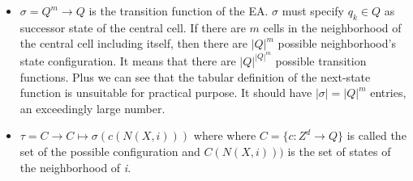 \begin{itemize}
  \item \begin{math}\sigma=Q^m \rightarrow Q \end{math} is the transition
  function of the EA. \begin{math}\sigma\end{math} must specify
  \begin{math}q_k \in Q \end{math} as successor  state of the central cell.
  If there are \begin{math}m\end{math} cells in the neighborhood of the central
  cell including itself, then there are
  \begin{math}{\left\vert{Q}\right\vert}^m\end{math} possible neighborhood's
  state configuration. It  means that there are
  \begin{math}{\left\vert{Q}\right\vert}^{{\left\vert{Q}\right\vert}^m}\end{math}
  possible transition functions. Plus we can see that the tabular definition of
  the next-state function is unsuitable for practical purpose. It should have
  \begin{math}\left\vert{\sigma}\right\vert={\left\vert{Q}\right\vert}^m\end{math}
  entries, an exceedingly large number.
  \item \begin{math}\tau=C \longrightarrow C \longmapsto
  \sigma(c(N(X,i))) \end{math} where 
  where $C=\{c \colon Z^d
  \rightarrow Q\}$
  is called the set of the possible configuration and 
  \begin{math}
  C(N(X,i)))\end{math} is the set of states of the neighborhood of \textit{i}.
\end{itemize}



